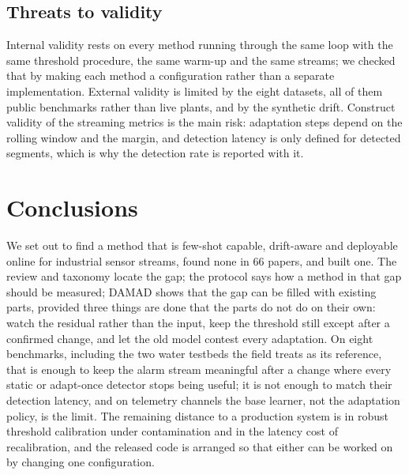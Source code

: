 \hypertarget{threats-to-validity}{%
\subsection{Threats to validity}\label{threats-to-validity}}

Internal validity rests on every method running through the same loop with the same threshold procedure, the same warm-up and the same streams; we checked that by making each method a configuration rather than a separate implementation. External validity is limited by the eight datasets, all of them public benchmarks rather than live plants, and by the synthetic drift. Construct validity of the streaming metrics is the main risk: adaptation steps depend on the rolling window and the margin, and detection latency is only defined for detected segments, which is why the detection rate is reported with it.

\hypertarget{conclusions}{%
\section{Conclusions}\label{conclusions}}

We set out to find a method that is few-shot capable, drift-aware and deployable online for industrial sensor streams, found none in 66 papers, and built one. The review and taxonomy locate the gap; the protocol says how a method in that gap should be measured; DAMAD shows that the gap can be filled with existing parts, provided three things are done that the parts do not do on their own: watch the residual rather than the input, keep the threshold still except after a confirmed change, and let the old model contest every adaptation. On eight benchmarks, including the two water testbeds the field treats as its reference, that is enough to keep the alarm stream meaningful after a change where every static or adapt-once detector stops being useful; it is not enough to match their detection latency, and on telemetry channels the base learner, not the adaptation policy, is the limit. The remaining distance to a production system is in robust threshold calibration under contamination and in the latency cost of recalibration, and the released code is arranged so that either can be worked on by changing one configuration.
